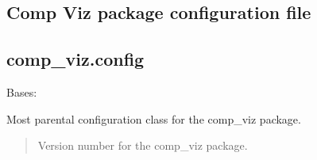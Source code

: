 \documentclass[letterpaper,10pt,english]{sphinxmanual}
\begin{document}
\subsection{Comp Viz package configuration file}
\label{\detokenize{comp_viz:comp-viz-package-configuration-file}}

\subsection{comp\_viz.config}
\label{\detokenize{comp_viz:module-comp_viz.config}}\label{\detokenize{comp_viz:comp-viz-config}}

\begin{fulllineitems}
\label{\detokenize{comp_viz:comp_viz.config.CompViz}}
\pysigstartsignatures
{}
\pysigstopsignatures
\sphinxAtStartPar
Bases: 

\sphinxAtStartPar
Most parental configuration class for the comp\_viz package.
\begin{quote}\begin{description}
\sphinxAtStartPar
{} \textendash{} Version number for the comp\_viz package.

\end{description}\end{quote}

\begin{fulllineitems}
\label{\detokenize{comp_viz:comp_viz.config.CompViz.version}}
\pysigstartsignatures
{}
\pysigstopsignatures
\end{fulllineitems}


\end{fulllineitems}

\end{document}
